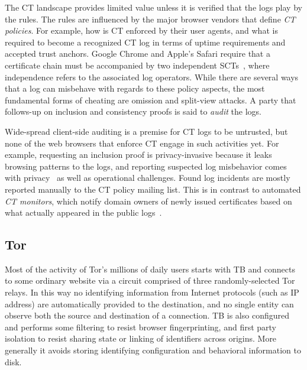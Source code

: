 The CT landscape provides limited value unless it is verified that the logs
play by the rules.  The rules are influenced by the major browser vendors that
define \emph{CT policies}.  For example, how is CT enforced by their user
agents, and what is required to become a recognized CT log in terms of uptime
requirements and accepted trust anchors.  Google Chrome and Apple's Safari
require that a certificate chain must be accompanied by two independent
SCTs~\cite{chrome-policy,safari-policy}, where independence refers to the
associated log operators.  While there are several ways that a log can misbehave
with regards to these policy aspects, the most fundamental forms of cheating are
omission and split-view attacks.  A party that follows-up on inclusion and
consistency proofs is said to \emph{audit} the logs.

Wide-spread client-side auditing is a premise for CT logs to be untrusted, but
none of the web browsers that enforce CT engage in such activities yet.  For
example, requesting an inclusion proof is privacy-invasive because it leaks
browsing patterns to the logs, and reporting suspected log misbehavior comes
with privacy~\cite{ct-with-privacy} as well as operational challenges.
Found log incidents are mostly reported manually to the CT policy mailing list.
This is in contrast to automated \emph{CT monitors}, which notify domain owners
of newly issued certificates based on what actually appeared in the public
logs~\cite{lwm,ct-monitors}.


\subsection{Tor} \label{sec:background:tor}

Most of the activity of Tor's millions of daily users starts with TB
and connects to some ordinary website via a circuit comprised of three
randomly-selected Tor relays. In this way no identifying information from
Internet protocols (such as IP address) are automatically provided to the
destination, and no single entity can observe both the source and destination of
a connection. TB is also configured and performs some filtering to resist
browser fingerprinting, and first party isolation to resist sharing state or
linking of identifiers across origins. More generally it avoids storing
identifying configuration and behavioral information to disk.

